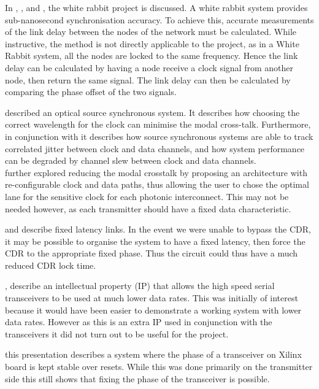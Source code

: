 \noindent In \cite{serrano2013white}, \cite{moreira2010digital}, and
\cite{moreira2009white}, the white rabbit project is discussed. A white rabbit
system provides sub-nanosecond synchronisation accuracy. To achieve this,
accurate measurements of the link delay between the nodes of the network must
be calculated.  While instructive, the method is not directly applicable to
the project, as in a White Rabbit system, all the nodes are locked to the same
frequency. Hence the link delay can be calculated by having a node receive a
clock signal from another node, then return the same signal. The link delay can
then be calculated by comparing the phase offset of the two signals.

\noindent \cite{williams2016source} described an optical source synchronous
system. It describes how choosing the correct wavelength for the clock can
minimise the modal cross-talk. Furthermore, in conjunction with
\cite{ragab2011receiver} it describes how source synchronous systems are able
to track correlated jitter between clock and data channels, and how system
performance can be degraded by channel slew between clock and data channels.\\
\cite{williams2019reconfiguration} further explored reducing the modal
crosstalk by proposing an architecture with re-configurable clock and data
paths, thus allowing the user to chose the optimal lane for the sensitive clock
for each photonic interconnect. This may not be needed however, as each
transmitter should have a fixed data characteristic.

\noindent \cite{chen2017optimization} and \cite{fixed_latency} describe fixed
latency links. In the event we were unable to bypass the CDR, it may be
possible to organise the system to have a fixed latency, then force the CDR to
the appropriate fixed phase. Thus the circuit could thus have a much reduced
CDR lock time.

\noindent \cite{dru_guide}, \cite{nidru} describe an intellectual property (IP)
that allows the high speed serial transceivers to be used at much lower data
rates. This was initially of interest because it would have been easier to
demonstrate a working system with lower data rates. However as this is an extra
IP used in conjunction with the transceivers it did not turn out to be useful
for the project. 

\noindent \cite{mendes_transceiver} this presentation describes a system where
the phase of a transceiver on Xilinx board is kept stable over resets. While
this was done primarily on the transmitter side this still shows that fixing
the phase of the transceiver is possible.

